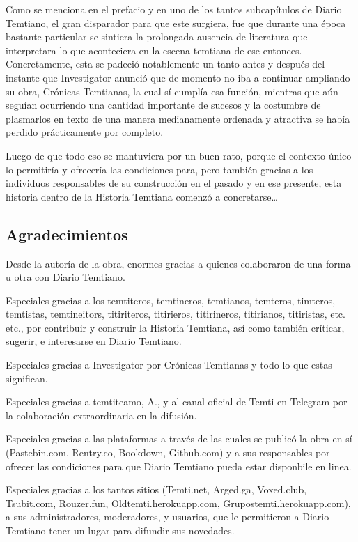 \documentclass[
  spanish,
]{book}
\begin{document}
Como se menciona en el prefacio y en uno de los tantos subcapítulos de Diario Temtiano, el gran disparador para que este surgiera, fue que durante una época bastante particular se sintiera la prolongada ausencia de literatura que interpretara lo que aconteciera en la escena temtiana de ese entonces. Concretamente, esta se padeció notablemente un tanto antes y después del instante que Investigator anunció que de momento no iba a continuar ampliando su obra, Crónicas Temtianas, la cual sí cumplía esa función, mientras que aún seguían ocurriendo una cantidad importante de sucesos y la costumbre de plasmarlos en texto de una manera medianamente ordenada y atractiva se había perdido prácticamente por completo.

Luego de que todo eso se mantuviera por un buen rato, porque el contexto único lo permitiría y ofrecería las condiciones para, pero también gracias a los individuos responsables de su construcción en el pasado y en ese presente, esta historia dentro de la Historia Temtiana comenzó a concretarse\ldots{}

\hypertarget{agradecimientos}{%
\subsection*{Agradecimientos}\label{agradecimientos}}

Desde la autoría de la obra, enormes gracias a quienes colaboraron de una forma u otra con Diario Temtiano.

Especiales gracias a los temtiteros, temtineros, temtianos, temteros, timteros, temtistas, temtineitors, titiriteros, titirieros, titirineros, titirianos, titiristas, etc. etc., por contribuir y construir la Historia Temtiana, así como también críticar, sugerir, e interesarse en Diario Temtiano.

Especiales gracias a Investigator por Crónicas Temtianas y todo lo que estas significan.

Especiales gracias a temtiteamo, A., y al canal oficial de Temti en Telegram por la colaboración extraordinaria en la difusión.

Especiales gracias a las plataformas a través de las cuales se publicó la obra en sí (Pastebin.com, Rentry.co, Bookdown, Github.com) y a sus responsables por ofrecer las condiciones para que Diario Temtiano pueda estar disponbile en linea.

Especiales gracias a los tantos sitios (Temti.net, Arged.ga, Voxed.club, Tsubit.com, Rouzer.fun, Oldtemti.herokuapp.com, Grupostemti.herokuapp.com), a sus administradores, moderadores, y usuarios, que le permitieron a Diario Temtiano tener un lugar para difundir sus novedades.
\end{document}
